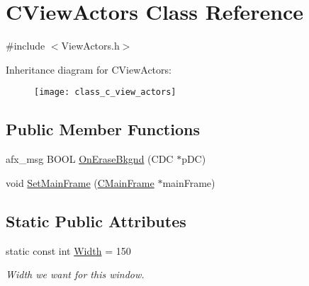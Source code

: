\hypertarget{class_c_view_actors}{\section{C\+View\+Actors Class Reference}
\label{class_c_view_actors}
}


{\ttfamily \#include $<$View\+Actors.\+h$>$}

Inheritance diagram for C\+View\+Actors\+:\begin{figure}[H]
\begin{center}
\leavevmode
\texttt{[image: class\_c\_view\_actors]}
\end{center}
\end{figure}
\subsection*{Public Member Functions}
\begin{DoxyCompactItemize}
\item 
afx\+\_\+msg B\+O\+O\+L \hyperlink{class_c_view_actors_a561f4be212bd5df4a667c2cb0b23e472}{On\+Erase\+Bkgnd} (C\+D\+C $\ast$p\+D\+C)
\item 
void \hyperlink{class_c_view_actors_a6f68ae9e71f6a195502464bf34b3e724}{Set\+Main\+Frame} (\hyperlink{class_c_main_frame}{C\+Main\+Frame} $\ast$main\+Frame)
\end{DoxyCompactItemize}
\subsection*{Static Public Attributes}
\begin{DoxyCompactItemize}
\item 
\hypertarget{class_c_view_actors_a8bb27cbe8ae099abbed012adca884f1f}{static const int \hyperlink{class_c_view_actors_a8bb27cbe8ae099abbed012adca884f1f}{Width} = 150}\label{class_c_view_actors_a8bb27cbe8ae099abbed012adca884f1f}

\begin{DoxyCompactList}\small\item\em Width we want for this window. \end{DoxyCompactList}\end{DoxyCompactItemize}

